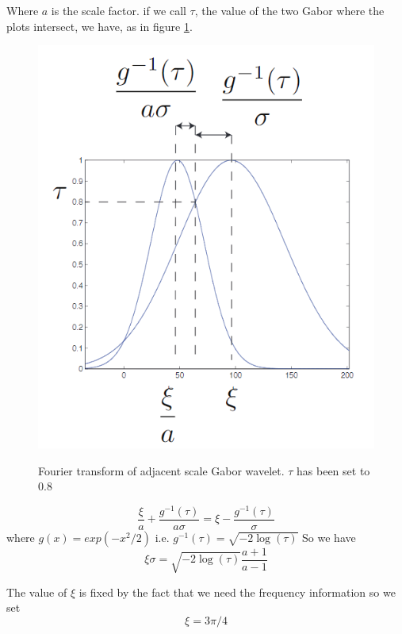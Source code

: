 Where $a$ is the scale factor.  if we call $\tau$, the value of the two Gabor where the plots intersect, we have, as in figure \ref{fig_app2_gab}.
\begin{figure}
\centering
  \includegraphics[width=14cm]{thesis/images/gab}\\
  \caption{Fourier transform of adjacent scale Gabor wavelet. $\tau$ has been set to 0.8} \label{fig_app2_gab}
\end{figure}
\begin{equation}
    \frac{\xi}{a}+\frac{g^{-1}(\tau)}{a\sigma}=\xi-\frac{g^{-1}(\tau)}{\sigma}
    \label{eqn_app2_wfil04}
\end{equation}
where $g(x)=exp(-x^2/2)$ i.e. $g^{-1}(\tau)=\sqrt{-2\log(\tau)}$
So we have
\begin{equation}
    \xi\sigma=\sqrt{-2\log(\tau)}\frac{a+1}{a-1}
    \label{eqn_app2_wfil05}
\end{equation}

The value of $\xi$ is fixed by the fact that we need the frequency information so we set 
\begin{equation}
    \xi=3\pi/4
    \label{eqn_app2_wfil06}
\end{equation}

